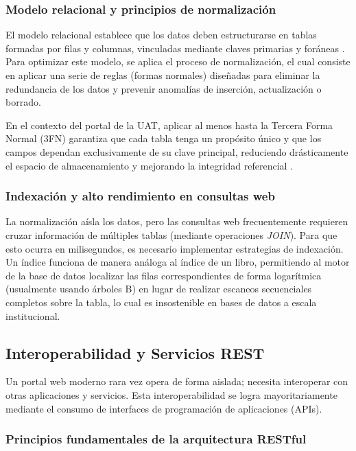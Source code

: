 \subsubsection*{Modelo relacional y principios de normalización}

El modelo relacional establece que los datos deben estructurarse en tablas formadas por filas y columnas, vinculadas mediante claves primarias y foráneas \cite{codd1990relational}. Para optimizar este modelo, se aplica el proceso de normalización, el cual consiste en aplicar una serie de reglas (formas normales) diseñadas para eliminar la redundancia de los datos y prevenir anomalías de inserción, actualización o borrado.

En el contexto del portal de la UAT, aplicar al menos hasta la Tercera Forma Normal (3FN) garantiza que cada tabla tenga un propósito único y que los campos dependan exclusivamente de su clave principal, reduciendo drásticamente el espacio de almacenamiento y mejorando la integridad referencial \cite{silberschatz2020database}.

\subsubsection*{Indexación y alto rendimiento en consultas web}

La normalización aísla los datos, pero las consultas web frecuentemente requieren cruzar información de múltiples tablas (mediante operaciones \textit{JOIN}). Para que esto ocurra en milisegundos, es necesario implementar estrategias de indexación. Un índice funciona de manera análoga al índice de un libro, permitiendo al motor de la base de datos localizar las filas correspondientes de forma logarítmica (usualmente usando árboles B) en lugar de realizar escaneos secuenciales completos sobre la tabla, lo cual es insostenible en bases de datos a escala institucional.

\subsection{Interoperabilidad y Servicios REST}
\label{sec:interoperabilidad_rest}

Un portal web moderno rara vez opera de forma aislada; necesita interoperar con otras aplicaciones y servicios. Esta interoperabilidad se logra mayoritariamente mediante el consumo de interfaces de programación de aplicaciones (APIs).

\subsubsection*{Principios fundamentales de la arquitectura RESTful}

